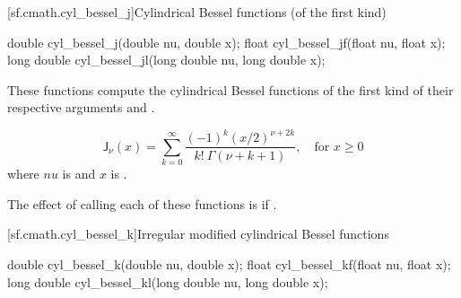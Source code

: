 [sf.cmath.cyl_bessel_j]{Cylindrical Bessel functions (of the first kind)}%
%
%
%
%
%
\begin{itemdecl}
double       cyl_bessel_j(double nu, double x);
float        cyl_bessel_jf(float nu, float x);
long double  cyl_bessel_jl(long double nu, long double x);
\end{itemdecl}

\begin{itemdescr}

\pnum\effects
These functions compute
the cylindrical Bessel functions of the first kind
of their respective arguments
 and .

\pnum\returns
\[%
  \mathsf{J}_\nu(x) =
  \sum_{k=0}^\infty \frac{(-1)^k (x/2)^{\nu+2k}}
			 {k! \: \Gamma(\nu+k+1)},
	   \quad \mbox{for $x \ge 0$}
\]
where
$nu$ is  and
$x$ is .

\pnum\remarks
The effect of calling each of these functions
is 
if .
\end{itemdescr}

[sf.cmath.cyl_bessel_k]{Irregular modified cylindrical Bessel functions}%
%
%
%
%
%
\begin{itemdecl}
double       cyl_bessel_k(double nu, double x);
float        cyl_bessel_kf(float nu, float x);
long double  cyl_bessel_kl(long double nu, long double x);
\end{itemdecl}

